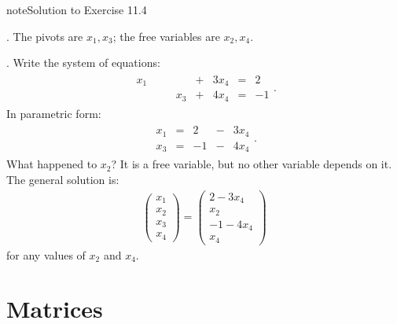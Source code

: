 \documentclass[letterpaper,10pt,english]{jupyterBook}
\begin{document}
\begin{sphinxadmonition}{note}{Solution to Exercise 11.4}



. The pivots are \(x_1, x_3\); the free variables are \(x_2, x_4\).

. Write the system of equations:
\begin{equation*}
\begin{split}
\begin{alignat*}{4}
x_1 & \quad &     & {}+{} & 3x_4 & {}={} & 2\\
    &       & x_3 & {}+{} & 4x_4 & {}={} & -1
\end{alignat*}.
\end{split}
\end{equation*}
\sphinxAtStartPar
In parametric form:
\begin{equation*}
\begin{split}
\begin{alignat*}{3}
x_1 & {}={} & 2 & {}-{} & 3x_4\\
x_3 & {}={} & -1 & {}-{} & 4x_4
\end{alignat*}.
\end{split}
\end{equation*}
\sphinxAtStartPar
What happened to \(x_2\)? It is a free variable, but no other variable depends on it. The general solution is:
\begin{equation*}
\begin{split}
\begin{pmatrix}
x_1\\x_2\\x_3\\x_4
\end{pmatrix}
=
\begin{pmatrix}
2-3x_4\\x_2\\-1-4x_4\\x_4
\end{pmatrix}
\end{split}
\end{equation*}
\sphinxAtStartPar
for any values of \(x_2\) and \(x_4\).
\end{sphinxadmonition}


\chapter{Matrices}
\label{\detokenize{LinearAlgebra/linear_systems_matrices/matrices:matrices}}\label{\detokenize{LinearAlgebra/linear_systems_matrices/matrices::doc}}
\end{document}
